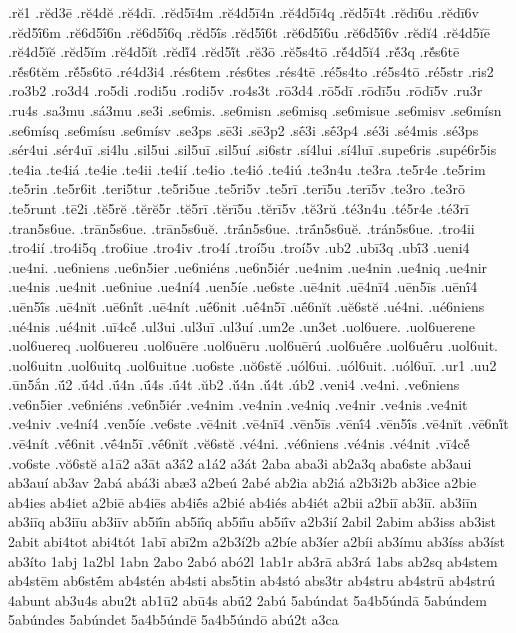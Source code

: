 {.rĕ1
.rĕd3ē
.rĕ4dĕ
.rĕ4dī.
.rĕd5ī4m
.rĕ4d5ī4n
.rĕ4d5ī4q
.rĕd5ī4t
.rĕdī6u
.rĕdī6v
.rĕd5ī́6m
.rĕ6d5ī́6n
.rĕ6d5ī́6q
.rĕd5ī́s
.rĕd5ī́6t
.rĕ6d5ī́6u
.rĕ6d5ī́6v
.rĕdĭ4
.rĕ4d5ĭē
.rĕ4d5ĭĕ
.rĕd5ĭm
.rĕ4d5ĭt
.rĕdĭ́4
.rĕd5ĭ́t
.rĕ3ō
.rĕ5s4tō
.rĕ́4d5ĭ4
.rĕ́3q
.rĕ́s6tē
.rĕ́s6tĕm
.rĕ́5s6tō
.ré4d3i4
.rés6tem
.rés6tes
.rés4tē
.ré5s4to
.ré5s4tō
.ré5str
.ris2
.ro3b2
.ro3d4
.ro5di
.rodi5u
.rodi5v
.ro4s3t
.rō3d4
.rō5dī
.rōdī5u
.rōdī5v
.ru3r
.ru4s
.sa3mu
.sá3mu
.se3i
.se6mis.
.se6misn
.se6misq
.se6misue
.se6misv
.se6mísn
.se6mísq
.se6mísu
.se6mísv
.se3ps
.sē3i
.sē3p2
.sḗ3i
.sḗ3p4
.sé3i
.sé4mis
.sé3ps
.sér4ui
.sér4uī
.si4lu
.sil5ui
.sil5uī
.sil5uí
.si6str
.sí4lui
.sí4luī
.supe6ris
.supé6r5is
.te4ia
.te4iá
.te4ie
.te4ii
.te4ií
.te4io
.te4ió
.te4iú
.te3n4u
.te3ra
.te5r4e
.te5rim
.te5rin
.te5r6it
.teri5tur
.te5ri5ue
.te5ri5v
.te5rī
.terī5u
.terī5v
.te3ro
.te3rō
.te5runt
.tē2i
.tĕ5rĕ
.tĕrĕ5r
.tĕ5rī
.tĕrī5u
.tĕrī5v
.tĕ3rŭ
.té3n4u
.té5r4e
.té3rī
.tran5s6ue.
.trān5s6ue.
.trān5s6uĕ.
.trā́n5s6ue.
.trā́n5s6uĕ.
.trán5s6ue.
.tro4ii
.tro4ií
.tro4i5q
.tro6iue
.tro4iv
.tro4í
.troí5u
.troí5v
.ub2
.ubī3q
.ubī́3
.ueni4
.ue4ni.
.ue6niens
.ue6n5ier
.ue6niéns
.ue6n5iér
.ue4nim
.ue4nin
.ue4niq
.ue4nir
.ue4nis
.ue4nit
.ue6niue
.ue4ní4
.uen5íe
.ue6ste
.uē4nit
.uē4nī4
.uēn5īs
.uēnī́4
.uēn5ī́s
.uē4nĭt
.uē6nĭ́t
.uē4nít
.uḗ6nit
.uḗ4n5ī
.uḗ6nĭt
.uĕ6stĕ
.ué4ni.
.ué6niens
.ué4nis
.ué4nit
.uī4cĕ́
.ul3ui
.ul3uī
.ul3uí
.um2e
.un3et
.uol6uere.
.uol6uerene
.uol6uereq
.uol6uereu
.uol6uēre
.uol6uēru
.uol6uērú
.uol6uḗre
.uol6uḗru
.uol6uit.
.uol6uitn
.uol6uitq
.uol6uitue
.uo6ste
.uŏ6stĕ
.uól6ui.
.uól6uit.
.uól6uī.
.ur1
.uu2
.ūn5ắn
.ū́2
.ū́4d
.ū́4n
.ū́4s
.ū́4t
.ŭb2
.ŭ́4n
.ŭ́4t
.úb2
.veni4
.ve4ni.
.ve6niens
.ve6n5ier
.ve6niéns
.ve6n5iér
.ve4nim
.ve4nin
.ve4niq
.ve4nir
.ve4nis
.ve4nit
.ve4niv
.ve4ní4
.ven5íe
.ve6ste
.vē4nit
.vē4nī4
.vēn5īs
.vēnī́4
.vēn5ī́s
.vē4nĭt
.vē6nĭ́t
.vē4nít
.vḗ6nit
.vḗ4n5ī
.vḗ6nĭt
.vĕ6stĕ
.vé4ni.
.vé6niens
.vé4nis
.vé4nit
.vī4cĕ́
.vo6ste
.vŏ6stĕ
a1ā2
a3āt
a3ā́2
a1á2
a3át
2aba
aba3i
ab2a3q
aba6ste
ab3aui
ab3auí
ab3av
2abá
abá3i
abæ3
a2beú
2abé
ab2ia
ab2iá
a2b3i2b
ab3ice
a2bie
ab4ies
ab4iet
a2biē
ab4iēs
ab4iḗs
a2bié
ab4iés
ab4iét
a2bii
a2biī
ab3iī.
ab3iīn
ab3iīq
ab3iīu
ab3iīv
ab5iī́n
ab5iī́q
ab5iī́u
ab5iī́v
a2b3ií
2abil
2abim
ab3iss
ab3ist
2abit
abi4tot
abi4tót
1abī
abī2m
a2b3í2b
a2bíe
ab3íer
a2bíi
ab3ímu
ab3íss
ab3íst
ab3íto
1abj
1a2bl
1abn
2abo
2abó
abó2l
1ab1r
ab3rā
ab3rá
1abs
ab2sq
ab4stem
ab4stēm
ab6stḗm
ab4stén
ab4sti
abs5tin
ab4stó
abs3tr
ab4stru
ab4strū
ab4strú
4abunt
ab3u4s
abu2t
ab1ū2
abū4s
abū́2
2abú
5abúndat
5a4b5úndā
5abúndem
5abúndes
5abúndet
5a4b5úndē
5a4b5úndō
abú2t
a3ca
}
